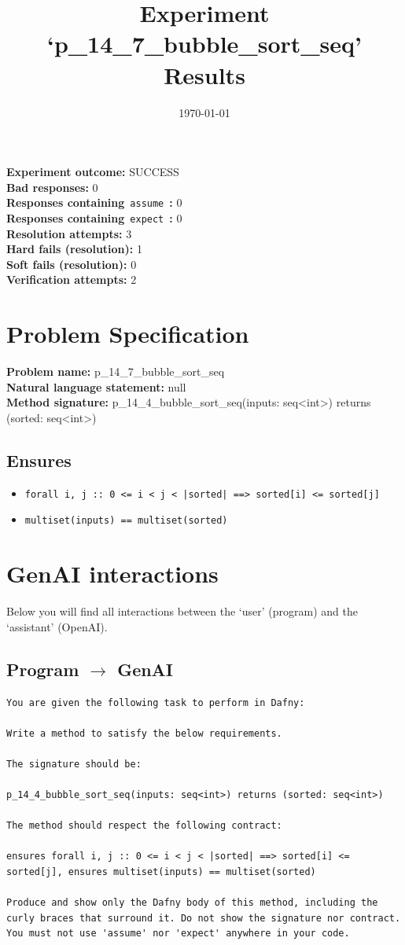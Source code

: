 \documentclass{article}
\begin{document}
\title{Experiment `p\_14\_7\_bubble\_sort\_seq' Results}
\author{\today}
\date{}
\maketitle
\textbf{Experiment outcome: }SUCCESS
\\\textbf{Bad responses: }0
\\\textbf{Responses containing}~\texttt{assume}~\textbf{: }0
\\\textbf{Responses containing}~\texttt{expect}~\textbf{: }0
\\\textbf{Resolution attempts: }3
\\\textbf{Hard fails (resolution): }1
\\\textbf{Soft fails (resolution): }0
\\\textbf{Verification attempts: }2
\section*{Problem Specification}
\textbf{Problem name: }p\_14\_7\_bubble\_sort\_seq
\\\textbf{Natural language statement: }null
\\\textbf{Method signature: }p\_14\_4\_bubble\_sort\_seq(inputs: seq<int>) returns (sorted: seq<int>)
\subsection*{Ensures}
\begin{itemize}
\item \texttt{forall i, j :: 0 <= i < j < |sorted| ==> sorted[i] <= sorted[j]}
\item \texttt{multiset(inputs) == multiset(sorted)}
\end{itemize}
\clearpage
\section*{GenAI interactions}
Below you will find all interactions between the `user' (program) and the `assistant' (OpenAI).
\subsection*{Program $\rightarrow$ GenAI}
\begin{lstlisting}
You are given the following task to perform in Dafny:

Write a method to satisfy the below requirements.

The signature should be:

p_14_4_bubble_sort_seq(inputs: seq<int>) returns (sorted: seq<int>)

The method should respect the following contract:

ensures forall i, j :: 0 <= i < j < |sorted| ==> sorted[i] <= sorted[j], ensures multiset(inputs) == multiset(sorted)

Produce and show only the Dafny body of this method, including the curly braces that surround it. Do not show the signature nor contract. You must not use 'assume' nor 'expect' anywhere in your code.
\end{lstlisting}
\end{document}
